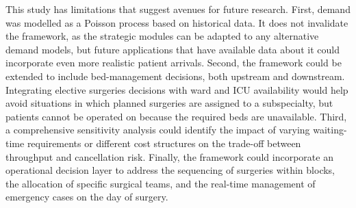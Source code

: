 This study has limitations that suggest avenues for future research. 
First, demand was modelled as a Poisson process based on historical data. 
It does not invalidate the framework, as the strategic modules can be adapted to any alternative demand models, but future applications that have available data about it could incorporate even more realistic patient arrivals. 
Second, the framework could be extended to include bed-management decisions, both upstream and downstream. 
Integrating elective surgeries decisions with ward and ICU availability would help avoid situations in which planned surgeries are assigned to a subspecialty, but patients cannot be operated on because the required beds are unavailable. 
Third, a comprehensive sensitivity analysis could identify the impact of varying waiting-time requirements or different cost structures on the trade-off between throughput and cancellation risk. 
Finally, the framework could incorporate an operational decision layer to address the sequencing of surgeries within blocks, the allocation of specific surgical teams, and the real-time management of emergency cases on the day of surgery.